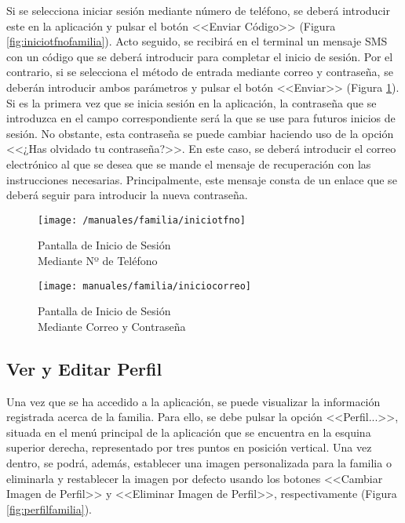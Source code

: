 Si se selecciona iniciar sesión mediante número de teléfono, se deberá introducir este en la aplicación y pulsar el botón <<Enviar Código>> (Figura \ref{fig:iniciotfnofamilia}). Acto seguido, se recibirá en el terminal un mensaje \acs{SMS} con un código que se deberá introducir para completar el inicio de sesión. Por el contrario, si se selecciona el método de entrada mediante correo y contraseña, se deberán introducir ambos parámetros y pulsar el botón <<Enviar>> (Figura \ref{fig:iniciocorreofamilia}). Si es la primera vez que se inicia sesión en la aplicación, la contraseña que se introduzca en el campo correspondiente será la que se use para futuros inicios de sesión. No obstante, esta contraseña se puede cambiar haciendo uso de la opción <<¿Has olvidado tu contraseña?>>. En este caso, se deberá introducir el correo electrónico al que se desea que se mande el mensaje de recuperación con las instrucciones necesarias. Principalmente, este mensaje consta de un enlace que se deberá seguir para introducir la nueva contraseña.

\begin{figure}[!h]
	\centering
	\begin{minipage}{.5\textwidth}
		\centering
		\texttt{[image: /manuales/familia/iniciotfno]}
		\caption{Pantalla de Inicio de Sesión \\ Mediante Nº de Teléfono}
		\label{fig:iniciotfnofamilia}
	\end{minipage}%
	\begin{minipage}{.5\textwidth}
		\centering
		\texttt{[image: manuales/familia/iniciocorreo]}
		\caption{Pantalla de Inicio de Sesión \\ Mediante Correo y Contraseña}
		\label{fig:iniciocorreofamilia}
	\end{minipage}
\end{figure}

\clearpage

\subsection*{Ver y Editar Perfil}
Una vez que se ha accedido a la aplicación, se puede visualizar la información registrada acerca de la familia. Para ello, se debe pulsar la opción <<Perfil...>>, situada en el menú principal de la aplicación que se encuentra en la esquina superior derecha, representado por tres puntos en posición vertical. Una vez dentro, se podrá, además, establecer una imagen personalizada para la familia o eliminarla y restablecer la imagen por defecto usando los botones <<Cambiar Imagen de Perfil>> y <<Eliminar Imagen de Perfil>>, respectivamente (Figura \ref{fig:perfilfamilia}).

